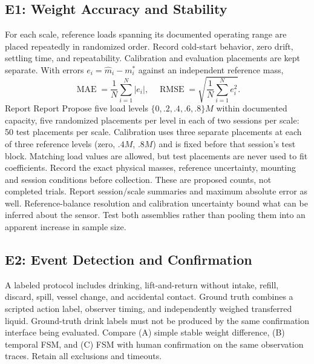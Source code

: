 \documentclass[conference]{IEEEtran}
\providecommand{\DIFadd}[1]{{\protect\color{blue} \sf #1}} %
\providecommand{\DIFdel}[1]{{\protect\color{red} \ifmmode #1\else\scriptsize #1\fi}} %
\providecommand{\DIFaddbegin}{} %
\providecommand{\DIFaddend}{} %
\providecommand{\DIFdelbegin}{} %
\providecommand{\DIFdelend}{} %
\begin{document}
\subsection{E1: Weight Accuracy and Stability}
For each scale, reference loads spanning its documented operating range are placed repeatedly in randomized order. Record cold-start behavior, zero drift, settling time, and repeatability. Calibration and evaluation placements are kept separate. With errors $e_i=\hat m_i-m_i^*$ against an independent reference mass,
\begin{equation}\operatorname{MAE}=\frac{1}{N}\sum_{i=1}^N|e_i|,\quad
\operatorname{RMSE}=\sqrt{\frac{1}{N}\sum_{i=1}^Ne_i^2}.\label{eq:errors}\end{equation}
\DIFdelbegin \DIFdel{Report }\DIFdelend \DIFaddbegin \DIFadd{Propose five load levels $\{0,.2,.4,.6,.8\}M$ within documented capacity, five randomized placements per level in each of two sessions per scale: 50 test placements per scale. Calibration uses three separate placements at each of three reference levels (zero, $.4M$, $.8M$) and is fixed before that session's test block. Matching load values are allowed, but test placements are never used to fit coefficients. Record the exact physical masses, reference uncertainty, mounting and session conditions before collection. These are proposed counts, not completed trials. Report session/scale summaries and }\DIFaddend maximum absolute error as well. Reference-balance resolution and calibration uncertainty bound what can be inferred about the sensor. Test both assemblies rather than pooling them into an apparent increase in sample size.

\subsection{E2: Event Detection and Confirmation}
A labeled protocol includes drinking, lift-and-return without intake, refill, discard, spill, vessel change, and accidental contact. Ground truth combines a scripted action label, observer timing, and independently weighed transferred liquid. Ground-truth drink labels must not be produced by the same confirmation interface being evaluated. Compare (A) simple stable weight difference, (B) temporal FSM, and (C) FSM with human confirmation on the same observation traces. Retain all exclusions and timeouts.
\end{document}
